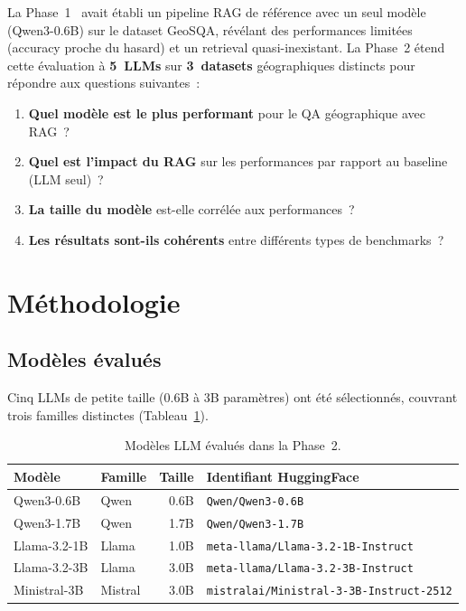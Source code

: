 \documentclass[12pt,a4paper]{article}
\begin{document}
La Phase~1~\cite{huang_geosqa_2019} avait \'etabli un pipeline RAG de r\'ef\'erence avec un seul mod\`ele (Qwen3-0.6B) sur le dataset GeoSQA, r\'ev\'elant des performances limit\'ees (accuracy proche du hasard) et un retrieval quasi-inexistant. La Phase~2 \'etend cette \'evaluation \`a \textbf{5~LLMs} sur \textbf{3~datasets} g\'eographiques distincts pour r\'epondre aux questions suivantes~:

\begin{enumerate}[leftmargin=*]
    \item \textbf{Quel mod\`ele est le plus performant} pour le QA g\'eographique avec RAG~?
    \item \textbf{Quel est l'impact du RAG} sur les performances par rapport au baseline (LLM seul)~?
    \item \textbf{La taille du mod\`ele} est-elle corr\'el\'ee aux performances~?
    \item \textbf{Les r\'esultats sont-ils coh\'erents} entre diff\'erents types de benchmarks~?
\end{enumerate}

\section{M\'ethodologie}

\subsection{Mod\`eles \'evalu\'es}

Cinq LLMs de petite taille (0.6B \`a 3B param\`etres) ont \'et\'e s\'electionn\'es, couvrant trois familles distinctes (Tableau~\ref{tab:modeles}).

\begin{table}[H]
\centering
\caption{Mod\`eles LLM \'evalu\'es dans la Phase~2.}
\label{tab:modeles}
\begin{tabular}{llrl}
\toprule
\textbf{Mod\`ele} & \textbf{Famille} & \textbf{Taille} & \textbf{Identifiant HuggingFace} \\
\midrule
Qwen3-0.6B & Qwen & 0.6B & \texttt{Qwen/Qwen3-0.6B} \\
Qwen3-1.7B & Qwen & 1.7B & \texttt{Qwen/Qwen3-1.7B} \\
Llama-3.2-1B & Llama & 1.0B & \texttt{meta-llama/Llama-3.2-1B-Instruct} \\
Llama-3.2-3B & Llama & 3.0B & \texttt{meta-llama/Llama-3.2-3B-Instruct} \\
Ministral-3B & Mistral & 3.0B & \texttt{mistralai/Ministral-3-3B-Instruct-2512} \\
\bottomrule
\end{tabular}
\end{table}
\end{document}
